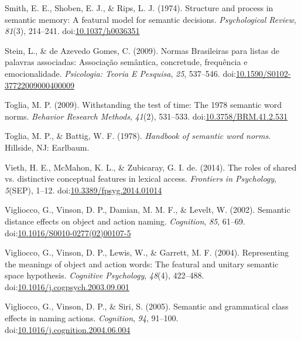 \documentclass[english,,man]{apa6}
\begin{document}
\leavevmode\hypertarget{ref-Smith1974}{}%
Smith, E. E., Shoben, E. J., \& Rips, L. J. (1974). Structure and process in semantic memory: A featural model for semantic decisions. \emph{Psychological Review}, \emph{81}(3), 214--241. doi:\href{https://doi.org/10.1037/h0036351}{10.1037/h0036351}

\leavevmode\hypertarget{ref-Stein2009}{}%
Stein, L., \& de Azevedo Gomes, C. (2009). Normas Brasileiras para listas de palavras associadas: Associação semântica, concretude, frequência e emocionalidade. \emph{Psicologia: Teoria E Pesquisa}, \emph{25}, 537--546. doi:\href{https://doi.org/10.1590/S0102-37722009000400009}{10.1590/S0102-37722009000400009}

\leavevmode\hypertarget{ref-Toglia2009}{}%
Toglia, M. P. (2009). Withstanding the test of time: The 1978 semantic word norms. \emph{Behavior Research Methods}, \emph{41}(2), 531--533. doi:\href{https://doi.org/10.3758/BRM.41.2.531}{10.3758/BRM.41.2.531}

\leavevmode\hypertarget{ref-Toglia1978}{}%
Toglia, M. P., \& Battig, W. F. (1978). \emph{Handbook of semantic word norms}. Hillside, NJ: Earlbaum.

\leavevmode\hypertarget{ref-Vieth2014}{}%
Vieth, H. E., McMahon, K. L., \& Zubicaray, G. I. de. (2014). The roles of shared vs. distinctive conceptual features in lexical access. \emph{Frontiers in Psychology}, \emph{5}(SEP), 1--12. doi:\href{https://doi.org/10.3389/fpsyg.2014.01014}{10.3389/fpsyg.2014.01014}

\leavevmode\hypertarget{ref-Vigliocco2002}{}%
Vigliocco, G., Vinson, D. P., Damian, M. M. F., \& Levelt, W. (2002). Semantic distance effects on object and action naming. \emph{Cognition}, \emph{85}, 61--69. doi:\href{https://doi.org/10.1016/S0010-0277(02)00107-5}{10.1016/S0010-0277(02)00107-5}

\leavevmode\hypertarget{ref-Vigliocco2004}{}%
Vigliocco, G., Vinson, D. P., Lewis, W., \& Garrett, M. F. (2004). Representing the meanings of object and action words: The featural and unitary semantic space hypothesis. \emph{Cognitive Psychology}, \emph{48}(4), 422--488. doi:\href{https://doi.org/10.1016/j.cogpsych.2003.09.001}{10.1016/j.cogpsych.2003.09.001}

\leavevmode\hypertarget{ref-Vigliocco2005}{}%
Vigliocco, G., Vinson, D. P., \& Siri, S. (2005). Semantic and grammatical class effects in naming actions. \emph{Cognition}, \emph{94}, 91--100. doi:\href{https://doi.org/10.1016/j.cognition.2004.06.004}{10.1016/j.cognition.2004.06.004}
\end{document}

